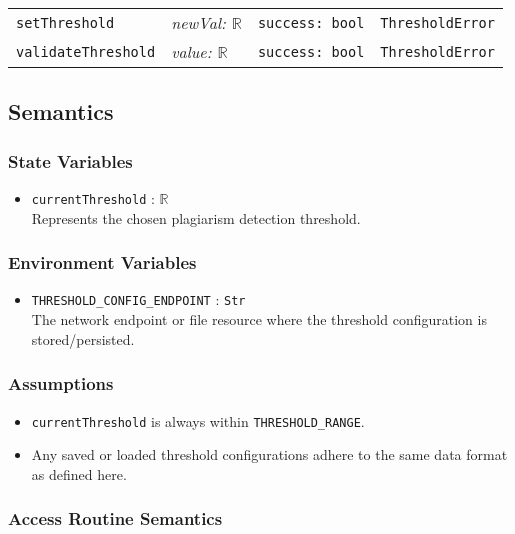 \documentclass[12pt, titlepage]{article}
\begin{document}
\begin{itemize}
\begin{center}
\begin{tabular}{p{3.5cm} p{3.8cm} p{3cm} p{2.5cm}}
\texttt{setThreshold} 
  & \textit{newVal: $\mathbb{R}$}
  & \texttt{success: bool}
  & \texttt{ThresholdError} \\

\texttt{validateThreshold} 
  & \textit{value: $\mathbb{R}$}
  & \texttt{success: bool} 
  & \texttt{ThresholdError} \\
\hline
\end{tabular}
\end{center}

\subsection{Semantics}

\subsubsection{State Variables}

\begin{itemize}
    \item \texttt{currentThreshold} : $\mathbb{R}$ \\
     Represents the chosen plagiarism detection threshold.
\end{itemize}

\subsubsection{Environment Variables}

\begin{itemize}
    \item \texttt{THRESHOLD\_CONFIG\_ENDPOINT} : \texttt{Str} \\
    The network endpoint or file resource where the threshold configuration is stored/persisted.
\end{itemize}

\subsubsection{Assumptions}

\begin{itemize}
    \item \texttt{currentThreshold} is always within \texttt{THRESHOLD\_RANGE}.
    \item Any saved or loaded threshold configurations adhere to the same data format as defined here.
\end{itemize}

\subsubsection{Access Routine Semantics}


\end{itemize}
\end{document}
